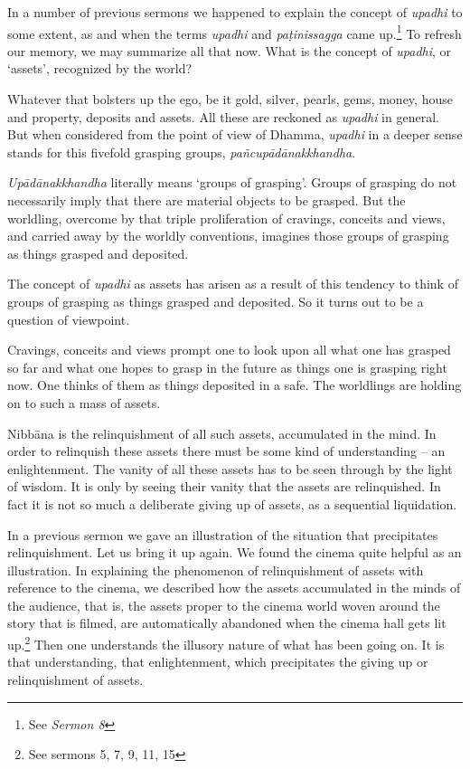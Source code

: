 In a number of previous sermons we happened to explain the concept of \emph{upadhi} to some extent, as and when the terms \emph{upadhi} and \emph{paṭinissagga} came up.\footnote{See \emph{Sermon 8}} To refresh our memory, we may summarize all that now. What is the concept of \emph{upadhi}, or `assets', recognized by the world?

Whatever that bolsters up the ego, be it gold, silver, pearls, gems, money, house and property, deposits and assets. All these are reckoned as \emph{upadhi} in general. But when considered from the point of view of Dhamma, \emph{upadhi} in a deeper sense stands for this fivefold grasping groups, \emph{pañcupādānakkhandha}.

\emph{Upādānakkhandha} literally means `groups of grasping'. Groups of grasping do not necessarily imply that there are material objects to be grasped. But the worldling, overcome by that triple proliferation of cravings, conceits and views, and carried away by the worldly conventions, imagines those groups of grasping as things grasped and deposited.

The concept of \emph{upadhi} as assets has arisen as a result of this tendency to think of groups of grasping as things grasped and deposited. So it turns out to be a question of viewpoint.

Cravings, conceits and views prompt one to look upon all what one has grasped so far and what one hopes to grasp in the future as things one is grasping right now. One thinks of them as things deposited in a safe. The worldlings are holding on to such a mass of assets.

Nibbāna is the relinquishment of all such assets, accumulated in the mind. In order to relinquish these assets there must be some kind of understanding -- an enlightenment. The vanity of all these assets has to be seen through by the light of wisdom. It is only by seeing their vanity that the assets are relinquished. In fact it is not so much a deliberate giving up of assets, as a sequential liquidation.

In a previous sermon we gave an illustration of the situation that precipitates relinquishment. Let us bring it up again. We found the cinema quite helpful as an illustration. In explaining the phenomenon of relinquishment of assets with reference to the cinema, we described how the assets accumulated in the minds of the audience, that is, the assets proper to the cinema world woven around the story that is filmed, are automatically abandoned when the cinema hall gets lit up.\footnote{See sermons 5, 7, 9, 11, 15} Then one understands the illusory nature of what has been going on. It is that understanding, that enlightenment, which precipitates the giving up or relinquishment of assets.

